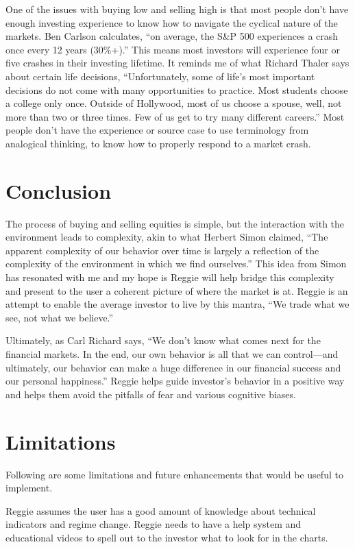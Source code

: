 \documentclass[conference]{IEEEtran}
\begin{document}
One of the issues with buying low and selling high is that most people don't have enough investing experience to know how to navigate the cyclical nature of the markets. Ben Carlson calculates, ``on average, the S\&P 500 experiences a crash once every 12 years (30\%+).''\cite{b11} This means most investors will experience four or five crashes in their investing lifetime. It reminds me of what Richard Thaler says about certain life decisions, ``Unfortunately, some of life's most important decisions do not come with many opportunities to practice. Most students choose a college only once. Outside of Hollywood, most of us choose a spouse, well, not more than two or three times. Few of us get to try many different careers.'' \cite{b9} Most people don't have the experience or source case to use terminology from analogical thinking, to know how to properly respond to a market crash.


\section{Conclusion}
 
The process of buying and selling equities is simple, but the interaction with the environment leads to complexity, akin to what Herbert Simon claimed, ``The apparent complexity of our behavior over time is largely a reflection of the complexity of the environment in which we find ourselves.'' \cite{b5} This idea from Simon has resonated with me and my hope is Reggie will help bridge this complexity and present to the user a coherent picture of where the market is at. Reggie is an attempt to enable the average investor to live by this mantra, ``We trade what we see, not what we believe.''\cite{b13} 

Ultimately, as Carl Richard says, ``We don't know what comes next for the financial markets. In the end, our own behavior is all that we can control—and ultimately, our behavior can make a huge difference in our financial success and our personal happiness.''\cite{b4} Reggie helps guide investor's behavior in a positive way and helps them avoid the pitfalls of fear and various cognitive biases.


\section{Limitations}

Following are some limitations and future enhancements that would be useful to implement. 

Reggie assumes the user has a good amount of knowledge about technical indicators and regime change. Reggie needs to have a help system and educational videos to spell out to the investor what to look for in the charts.
\end{document}
